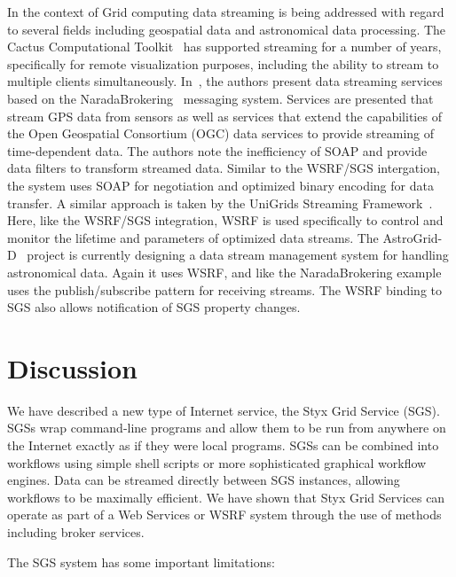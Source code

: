 \documentclass[a4paper]{article}
\begin{document}
In the context of Grid computing data streaming is being addressed with regard to several fields including geospatial data and astronomical data processing. The Cactus Computational Toolkit~\cite{allen:2001} has supported streaming for a number of years, specifically for remote visualization purposes, including the ability to stream to multiple clients simultaneously. In~\cite{fox:2006}, the authors present data streaming services based on the NaradaBrokering~\cite{naradabrokering} messaging system. Services are presented that stream GPS data from sensors as well as services that extend the capabilities of the Open Geospatial Consortium (OGC) data services to provide streaming of time-dependent data. The authors note the inefficiency of SOAP and provide data filters to transform streamed data. Similar to the WSRF/SGS intergation, the system uses SOAP for negotiation and optimized binary encoding for data transfer. A similar approach is taken by the UniGrids Streaming Framework~\cite{benedyczak:2006}. Here, like the WSRF/SGS integration, WSRF is used specifically to control and monitor the lifetime and parameters of optimized data streams. The AstroGrid-D~\cite{astrogrid-d} project is currently designing a data stream management system for handling astronomical data. Again it uses WSRF, and like the NaradaBrokering example uses the publish/subscribe pattern for receiving streams. The WSRF binding to SGS also allows notification of SGS property changes.

\section{Discussion}

We have described a new type of Internet service, the Styx Grid Service (SGS).  SGSs wrap command-line programs and allow them to be run from anywhere on the Internet exactly as if they were local programs.  SGSs can be combined into workflows using simple shell scripts or more sophisticated graphical workflow engines.  Data can be streamed directly between SGS instances, allowing workflows to be maximally efficient.  We have shown that Styx Grid Services can operate as part of a Web Services or WSRF system through the use of methods including broker services.

The SGS system has some important limitations:
\end{document}
